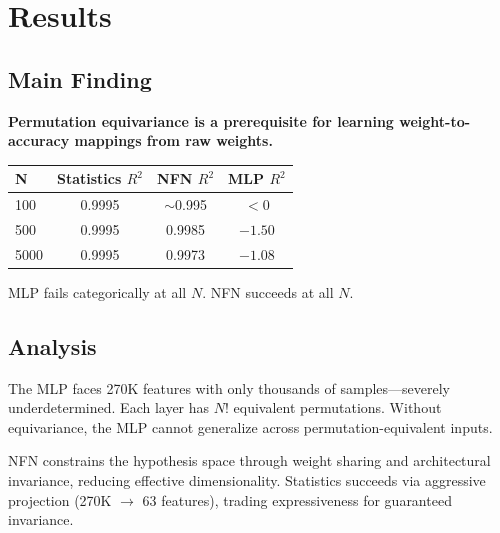 \section{Results}

\subsection{Main Finding}

\textbf{Permutation equivariance is a prerequisite for learning weight-to-accuracy mappings from raw weights.}

\begin{table}[h]
\centering
\begin{tabular}{lccc}
\toprule
\textbf{N} & \textbf{Statistics $R^2$} & \textbf{NFN $R^2$} & \textbf{MLP $R^2$} \\
\midrule
100 & 0.9995 & $\sim$0.995 & $< 0$ \\
500 & 0.9995 & 0.9985 & $-1.50$ \\
5000 & 0.9995 & 0.9973 & $-1.08$ \\
\bottomrule
\end{tabular}
\end{table}

MLP fails categorically at all $N$. NFN succeeds at all $N$.

\subsection{Analysis}

The MLP faces 270K features with only thousands of samples---severely underdetermined. Each layer has $N!$ equivalent permutations. Without equivariance, the MLP cannot generalize across permutation-equivalent inputs.

NFN constrains the hypothesis space through weight sharing and architectural invariance, reducing effective dimensionality. Statistics succeeds via aggressive projection (270K $\rightarrow$ 63 features), trading expressiveness for guaranteed invariance.
